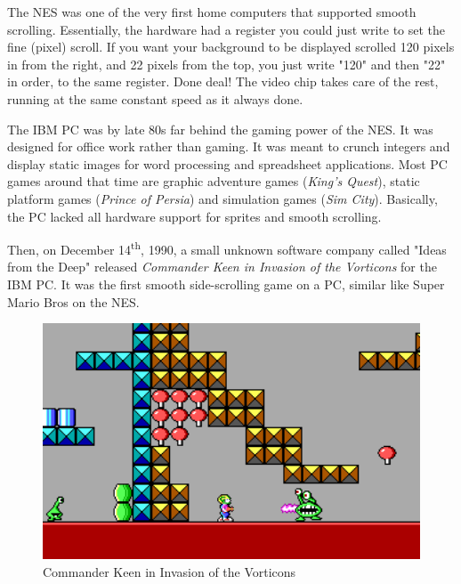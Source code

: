 \par
The NES was one of the very first home computers that supported smooth scrolling. Essentially, the hardware had a register you could just write to set the fine (pixel) scroll. If you want your background to be displayed scrolled 120 pixels in from the right, and 22 pixels from the top, you just write "120" and then "22" in order, to the same register. Done deal! The video chip takes care of the rest, running at the same constant speed as it always done.\\
\par
The IBM PC was by late 80s far behind the gaming power of the NES. It was designed for office work rather than gaming. It was meant to crunch integers and display static images for word processing and spreadsheet applications. Most PC games around that time are graphic adventure games (\textit{King's Quest}), static platform games (\textit{Prince of Persia}) and simulation games (\textit{Sim City}). Basically, the PC lacked all hardware support for sprites and smooth scrolling.\\
\par
Then, on December 14\textsuperscript{th}, 1990, a small unknown software company called "Ideas from the Deep" released \textit{Commander Keen in Invasion of the Vorticons} for the IBM PC. It was the first smooth side-scrolling game on a PC, similar like Super Mario Bros on the NES. \\
\begin{figure}[H]
  \centering
 \includegraphics[width=1.0\textwidth]{screenshots_300dpi/Keen_Marooned_on_Mars_gameplay.png}
\caption{Commander Keen in Invasion of the Vorticons}
\end{figure}
\par

